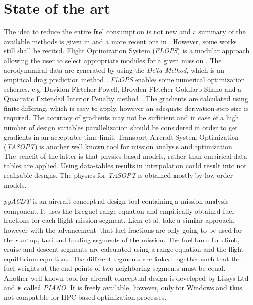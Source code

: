\section{State of the art}
\label{sec_1_State}
The idea to reduce the entire fuel consumption is not
new and a summary
of the available methods is given in \cite{betts_survey_1998} 
and a more recent one in \cite{kao_modular_2015}. However,
some works still shall be recited. Flight Optimization System 
(\emph{FLOPS}) is a modular approach allowing the user to select 
appropriate modules for a given mission \cite{mccullers_aircraft_1984}.
The aerodynamical data are generated by using the \emph{Delta Method}, 
which is an empirical drag prediction method \cite{feagin_delta_1978}. 
\emph{FLOPS} enables some numerical optimization schemes, e.g. Davidon-Fletcher-Powell,
Broyden-Fletcher-Goldfarb-Shano and a Quadratic Extended Interior Penalty method 
\cite{kao_modular_2015}. The gradients are calculated using finite 
differing, which is easy to apply, however an adequate 
derivation step size is required. The accuracy of gradients may 
not be sufficient and in case of a high number of design variables 
parallelization should be considered in order to get gradients 
in an acceptable time limit. Transport Aircraft System Optimization 
(\emph{TASOPT}) is another well known tool for mission analysis and 
optimization \cite{greitzer_design_2010}. The benefit of the latter 
is that physics-based models, rather than empirical data-tables are 
applied. Using 
data-tables results in interpolation could result into not 
realizable designs. The physics for \emph{TASOPT} is obtained mostly by low-order 
models.\newline 

\emph{pyACDT} is an aircraft conceptual design tool \cite{perez_pyacdt_2008} 
containing a mission analysis component. It uses the Breguet 
range equation and empirically obtained fuel fractions for each 
flight mission segment. Liem et al. \cite{liem_aerostructural_2013} 
take a similar 
approach, however with the advancement, that fuel fractions are only 
going to be used for the startup, taxi and landing segments of the mission.
The fuel burn for climb, cruise and descent segments are calculated 
using a range equation and the flight equilibrium equations. The 
different segments are linked together such that the fuel weights at 
the end points of two neighboring segments must be equal. 
Another well known tool for aircraft conceptual design 
is developed by Lissys Ltd and is called \emph{PIANO}. It 
is freely available, however, only for Windows and thus 
not compatible for HPC-based optimization processes.
\newline 

